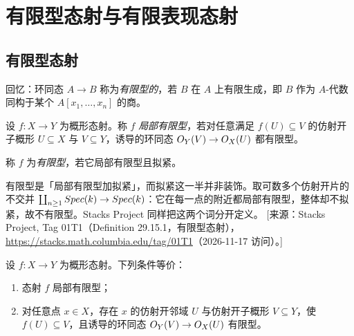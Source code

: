 
\section{有限型态射与有限表现态射}\label{sec:23}

\subsection{有限型态射}\label{sec:23.1}

回忆：环同态 $A \to B$ 称为\emph{有限型的}，若 $B$ 在 $A$ 上有限生成，即 $B$ 作为 $A$-代数同构于某个 $A[x_1,\dots,x_n]$ 的商。

\begin{definition}\label{def:23.1.1}
设 $f\colon X \to Y$ 为概形态射。称 $f$ \emph{局部有限型}，若对任意满足 $f(U) \subseteq V$ 的仿射开子概形 $U \subseteq X$ 与 $V \subseteq Y$，诱导的环同态 $O_Y(V) \to O_X(U)$ 都有限型。

称 $f$ 为\emph{有限型}，若它局部有限型且拟紧。
\end{definition}

\begin{yizhu}
有限型是「局部有限型加拟紧」，而拟紧这一半并非装饰。取可数多个仿射开片的不交并 $\coprod_{n \ge 1} Spec(k) \to Spec(k)$：它在每一点的附近都局部有限型，整体却不拟紧，故不有限型。Stacks Project 同样把这两个词分开定义。
[来源：Stacks Project, Tag 01T1（Definition 29.15.1，有限型态射），\url{https://stacks.math.columbia.edu/tag/01T1}（2026-11-17 访问）。]
\end{yizhu}

\begin{lemma}\label{lem:23.1.2}
设 $f\colon X \to Y$ 为概形态射。下列条件等价：
\begin{enumerate}[label=(\roman*),leftmargin=2em,itemsep=0.25ex]
  \item 态射 $f$ 局部有限型；
  \item 对任意点 $x \in X$，存在 $x$ 的仿射开邻域 $U$ 与仿射开子概形 $V \subseteq Y$，使 $f(U) \subseteq V$，且诱导的环同态 $O_Y(V) \to O_X(U)$ 有限型。
\end{enumerate}
\end{lemma}

